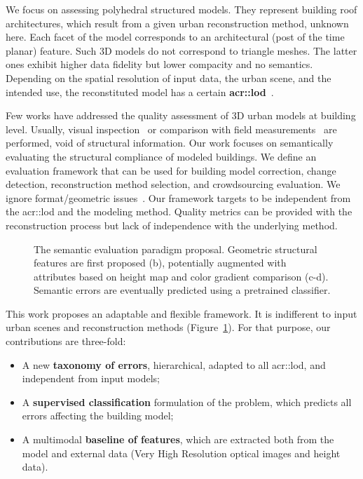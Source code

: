 \documentclass[conference]{IEEEtran}
\begin{document}
    We focus on assessing polyhedral structured models. They represent building roof architectures, which result from a given urban reconstruction method, unknown here. Each facet of the model corresponds to an architectural (post of the time planar) feature. Such 3D models do not correspond to triangle meshes. The latter ones exhibit higher data fidelity but lower compacity and no semantics. Depending on the spatial resolution of input data, the urban scene, and the intended use, the reconstituted model has a certain \textbf{\gls{acr::lod}}~\cite{kolbe2005citygml}.
    
    Few works have addressed the quality assessment of 3D urban models at building level. Usually, visual inspection~\cite{Durupt2006} or comparison with field measurements~\cite{Kaartinen2005} are performed, void of structural information. Our work focuses on semantically evaluating the structural compliance of modeled buildings. We define an evaluation framework that can be used for building model correction, change detection, reconstruction method selection, and crowdsourcing evaluation. We ignore format/geometric issues~\cite{ledoux2018val3dity}. Our framework targets to be independent from the \acrlong{acr::lod} and the modeling method. Quality metrics can be provided with the reconstruction process but lack of independence with the underlying method. 

	\begin{figure}
        \begin{center}
            
           \vspace{-1.3cm} \caption{\label{fig::pipeline} The semantic evaluation paradigm proposal. Geometric structural features are first proposed (b), potentially augmented with attributes based on height map and color gradient comparison (c-d). Semantic errors are eventually predicted using a pretrained classifier.}
        \end{center}
    \end{figure}

     This work proposes an adaptable and flexible framework. It is indifferent to input urban scenes and reconstruction methods (Figure~\ref{fig::pipeline}). For that purpose, our contributions are three-fold:
    \begin{itemize}
        \item A new \textbf{taxonomy of errors}, hierarchical, adapted to all \acrshort{acr::lod}, and independent from input models;
        \item A \textbf{supervised classification} formulation of the problem, which predicts all errors affecting the building model;
        \item A multimodal \textbf{baseline of features}, which are extracted both from the model and external data (Very High Resolution optical images and height data).
    \end{itemize}
\end{document}
